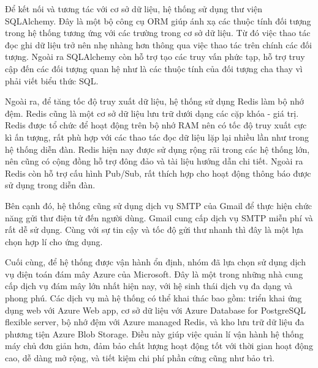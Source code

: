 \documentclass[../main.tex]{subfiles}
\begin{document}
Để kết nối và tương tác với cơ sở dữ liệu, hệ thống sử dụng thư viện SQLAlchemy. Đây là một bộ công cụ ORM giúp ánh xạ các thuộc tính đối tượng trong hệ thống tương ứng với các trường trong cơ sở dữ liệu. Từ đó việc thao tác đọc ghi dữ liệu trở nên nhẹ nhàng hơn thông qua việc thao tác trên chính các đối tượng.
Ngoài ra SQLAlchemy còn hỗ trợ tạo các truy vấn phức tạp, hỗ trợ truy cập đến các đối tượng quan hệ như là các thuộc tính của đối tượng cha thay vì phải viết biểu thức SQL.


Ngoài ra, để tăng tốc độ truy xuất dữ liệu, hệ thống sử dụng Redis làm bộ nhớ đệm. Redis cũng là một cơ sở dữ liệu lưu trữ dưới dạng các cặp khóa - giá trị. Redis được tổ chức để hoạt động trên bộ nhớ RAM nên có tốc độ truy xuất cực kì ấn tượng, rất phù hợp với các thao tác đọc dữ liệu lặp lại nhiều lần như trong hệ thống diễn đàn.
Redis hiện nay được sử dụng rộng rãi trong các hệ thống lớn, nên cũng có cộng đồng hỗ trợ đông đảo và tài liệu hướng dẫn chi tiết. Ngoài ra Redis còn hỗ trợ cấu hình Pub/Sub, rất thích hợp cho hoạt động thông báo được sử dụng trong diễn đàn.

Bên cạnh đó, hệ thống cũng sử dụng dịch vụ SMTP của Gmail để thực hiện chức năng gửi thư điện tử đến người dùng. Gmail cung cấp dịch vụ SMTP miễn phí và rất dễ sử dụng. Cùng với sự tin cậy và tốc độ gửi thư nhanh thì đây là một lựa chọn hợp lí cho ứng dụng.

Cuối cùng, để hệ thống được vận hành ổn định, nhóm đã lựa chọn sử dụng dịch vụ điện toán đám mây Azure của Microsoft. Đây là một trong những nhà cung cấp dịch vụ đám mây lớn nhất hiện nay, với hệ sinh thái dịch vụ đa dạng và phong phú. Các dịch vụ mà hệ thống có thể khai thác bao gồm: triển khai ứng dụng web với Azure Web app, cơ sở dữ liệu với Azure Database for PostgreSQL flexible server, bộ nhớ đệm với Azure managed Redis, và kho lưu trữ dữ liệu đa phương tiện Azure Blob Storage.
Điều này giúp việc quản lí vận hành hệ thống máy chủ đơn giản hơn, đảm bảo chất lượng hoạt động tốt với thời gian hoạt động cao, dễ dàng mở rộng, và tiết kiệm chi phí phần cứng cũng như bảo trì.
\end{document}
